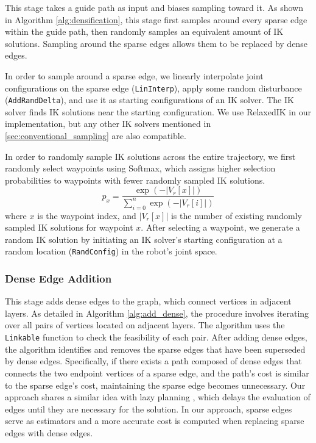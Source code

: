 This stage takes a guide path as input and biases sampling toward it. As shown in Algorithm \ref{alg:densification}, this stage first samples around every sparse edge within the guide path, then randomly samples an equivalent amount of IK solutions. 
Sampling around the sparse edges allows them to be replaced by dense edges.

In order to sample around a sparse edge,  we linearly interpolate joint configurations on the sparse edge ({\small \texttt{LinInterp}}), apply some random disturbance ({\small\texttt{AddRandDelta}}), and use it as starting configurations of an IK solver. The IK solver finds IK solutions near the starting configuration. We use RelaxedIK \cite{rakita2018relaxedik} in our implementation, but any other IK solvers mentioned in \cref{sec:conventional_sampling} are also compatible. 

In order to randomly sample IK solutions across the entire trajectory, we first randomly select waypoints using Softmax, which assigns higher selection probabilities to waypoints with fewer randomly sampled IK solutions.
 \begin{equation} 
   \label{eq:probability}
     p_x{=}\frac{\exp(-|V_r[x]|)}{\sum_{i=0}^{n} \exp(-|V_r[i]|)}
\end{equation}
where $x$ is the waypoint index, and $|V_r[x]|$ is the number of existing randomly sampled IK solutions for waypoint $x$. After selecting a waypoint, we generate a random IK solution by initiating an IK solver's starting configuration at a random location ({\small\texttt{RandConfig}}) in the robot's joint space. 

   
   
\subsubsection{Dense Edge Addition}


This stage adds dense edges to the graph, which connect vertices in adjacent layers. As detailed in Algorithm \ref{alg:add_dense}, the procedure involves iterating over all pairs of vertices located on adjacent layers. The algorithm uses the {\small\texttt{Linkable}} function to check the feasibility of each pair. After adding dense edges, the algorithm identifies and removes the sparse edges that have been superseded by dense edges. Specifically, if there exists a path composed of dense edges that connects the two endpoint vertices of a sparse edge, and the path's cost is similar to the sparse edge's cost, maintaining the sparse edge becomes unnecessary. Our approach shares a similar idea with lazy planning \cite{bohlin2000path, haghtalab2018provable}, which delays the evaluation of edges until they are necessary for the solution. In our approach, sparse edges serve as estimators and a more accurate cost is computed when replacing sparse edges with dense edges. 

